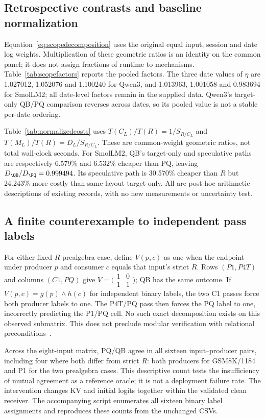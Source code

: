\subsection{Retrospective contrasts and baseline normalization}
\label{supp:targetedcontrasts}
Equation~\eqref{eq:scopedecomposition} uses the original equal input, session and date log weights. Multiplication of these geometric ratios is an identity on the common panel; it does not assign fractions of runtime to mechanisms. Table~\ref{tab:scopefactors} reports the pooled factors. The three date values of $\eta$ are 1.027012, 1.052076 and 1.100240 for Qwen3, and 1.013963, 1.001058 and 0.983694 for SmolLM2; all date-level factors remain in the supplied data. Qwen3's target-only QB/PQ comparison reverses across dates, so its pooled value is not a stable per-date ordering.




Table~\ref{tab:normalizedcosts} uses $T(C_L)/T(R)=1/S_{R/C_L}$ and $T(M_L)/T(R)=D_L/S_{R/C_L}$. These are common-weight geometric ratios, not total wall-clock seconds. For SmolLM2, QB's target-only and speculative paths are respectively 6.579\% and 6.532\% cheaper than PQ, leaving $D_{\QB}/D_{\PQ}=0.999494$. Its speculative path is 30.570\% cheaper than $R$ but 24.243\% more costly than same-layout target-only. All are post-hoc arithmetic descriptions of existing records, with no new measurements or uncertainty test.

\subsection{A finite counterexample to independent pass labels}
\label{supp:targetedeligibility}
For either fixed-$R$ prealgebra case, define $V(p,c)$ as one when the endpoint under producer $p$ and consumer $c$ equals that input's strict $R$. Rows $(P1,P4T)$ and columns $(C1,PQ)$ give $V=\bigl(\begin{smallmatrix}1&0\\1&1\end{smallmatrix}\bigr)$; QB has the same outcome. If $V(p,c)=g(p)\wedge h(c)$ for independent binary labels, the two C1 passes force both producer labels to one. The P4T/PQ pass then forces the PQ label to one, incorrectly predicting the P1/PQ cell. No such exact decomposition exists on this observed submatrix. This does not preclude modular verification with relational preconditions~\cite{vosti}.

Across the eight-input matrix, PQ/QB agree in all sixteen input--producer pairs, including four where both differ from strict $R$: both producers for GSM8K/1184 and P1 for the two prealgebra cases. This descriptive count tests the insufficiency of mutual agreement as a reference oracle; it is not a deployment failure rate. The intervention changes KV and initial logits together within the validated clean receiver. The accompanying script enumerates all sixteen binary label assignments and reproduces these counts from the unchanged CSVs.

